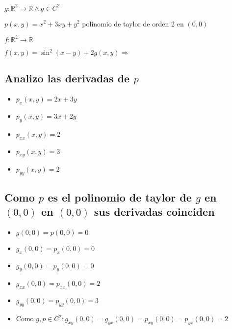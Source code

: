 \documentclass[../parcial.tex]{subfiles}
\begin{document}
    $g: \mathbb{R}^2 \to \mathbb{R} \wedge g \in C^2$

    $p(x,y) = x^2 + 3xy + y ^2$ polinomio de taylor de orden 2 en $(0,0)$

    $f:\mathbb{R}^2 \to \mathbb{R}$

    $f(x,y) = \sin^2(x-y)+2g(x,y) \Rightarrow$

    \subsection*{Analizo las derivadas de $p$}

    \begin{itemize}
        \item $p_x(x,y) = 2x + 3y $
        \item $p_y(x,y) = 3x + 2y $
        \item $p_{xx}(x,y) = 2 $
        \item $p_{xy}(x,y) = 3 $
        \item $p_{yy}(x,y) = 2 $
    \end{itemize}

    \subsection*{Como $p$ es el polinomio de taylor de $g$ en $(0,0)$ en $(0,0)$ sus derivadas coinciden}

    \begin{itemize}
        \item $g(0,0) = p(0,0) = 0 $
        \item $g_x(0,0) = p_x(0,0) = 0 $
        \item $g_y(0,0) = p_y(0,0) = 0 $
        \item $g_{xx}(0,0) = p_{xx}(0,0) = 2 $
        \item $g_{yy}(0,0) = p_{yy}(0,0) = 3 $
        \item Como $g,p \in C^2: g_{xy}(0,0) = g_{yx}(0,0) = p_{xy}(0,0) = p_{yx}(0,0) = 2$
    \end{itemize}
\end{document}
